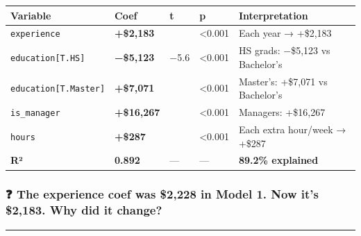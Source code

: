 \documentclass[
]{article}
\begin{document}
\begin{longtable}[]{@{}
  >{\raggedright\arraybackslash}p{}
  >{\raggedleft\arraybackslash}p{}
  >{\raggedleft\arraybackslash}p{}
  >{\raggedleft\arraybackslash}p{}
  >{\raggedright\arraybackslash}p{}@{}}
\toprule\noalign{}
\begin{minipage}[b]{\linewidth}\raggedright
Variable
\end{minipage} & \begin{minipage}[b]{\linewidth}\raggedleft
Coef
\end{minipage} & \begin{minipage}[b]{\linewidth}\raggedleft
t
\end{minipage} & \begin{minipage}[b]{\linewidth}\raggedleft
p
\end{minipage} & \begin{minipage}[b]{\linewidth}\raggedright
Interpretation
\end{minipage} \\
\midrule\noalign{}
\endhead
\bottomrule\noalign{}
\endlastfoot
\texttt{experience} & \textbf{+\$2,183} & 57.2 & \textless0.001 & Each
year → +\$2,183 \\
\texttt{education{[}T.HS{]}} & \textbf{−\$5,123} & −5.6 & \textless0.001
& HS grads: −\$5,123 vs Bachelor's \\
\texttt{education{[}T.Master{]}} & \textbf{+\$7,071} & 7.5 &
\textless0.001 & Master's: +\$7,071 vs Bachelor's \\
\texttt{is\_manager} & \textbf{+\$16,267} & 16.5 & \textless0.001 &
Managers: +\$16,267 \\
\texttt{hours} & \textbf{+\$287} & 4.7 & \textless0.001 & Each extra
hour/week → +\$287 \\
\textbf{R²} & \textbf{0.892} & --- & --- & \textbf{89.2\% explained} \\
\end{longtable}

\subsubsection{❓ The experience coef was \$2,228 in Model 1. Now it's
\$2,183. Why did it
change?}\label{the-experience-coef-was-2228-in-model-1.-now-its-2183.-why-did-it-change}

\begin{center}\rule{0.5\linewidth}{0.5pt}\end{center}
\end{document}

